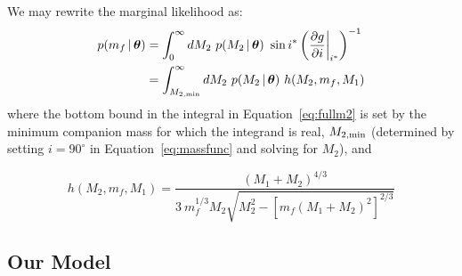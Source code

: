 \documentclass[apjl]{emulateapj}
\newcommand{\given}{\,|\,}
\newcommand{\bs}[1]{\boldsymbol{#1}}
\newcommand{\degree}{^{\circ}}
\newcommand{\eqn}{Equation~}
\newcommand{\mf}{m_f}
\begin{document}
We may rewrite the marginal likelihood as:
\begin{align}
	p(\mf \given \bs{\theta}) &= \int_{0}^\infty dM_2~p(M_2 \given \bs{\theta})~\sin i^* \left(\frac{\partial g}{\partial i}\bigg\rvert_{i^*}\right)^{-1}\\
	&= \int_{M_{2,{\rm min}}}^\infty dM_2~p(M_2 \given \bs{\theta})~h(M_2, \mf, M_1) \label{eq:fullm2}
\end{align}
where the bottom bound in the integral in \eqn\ref{eq:fullm2} is set by the minimum companion mass for which the integrand is real, $M_{2,{\rm min}}$ (determined by setting $i=90\degree$ in \eqn\ref{eq:massfunc} and solving for $M_2$), and

\begin{equation}
h(M_2, \mf, M_1) = \frac{(M_1+M_2)^{4/3}}{3\ \mf^{1/3}M_2\sqrt{M_2^2 - \left[ \mf(M_1+M_2)^2 \right]^{2/3}}}
\end{equation}


\subsection{Our Model} \label{sec:experiments}
\end{document}
